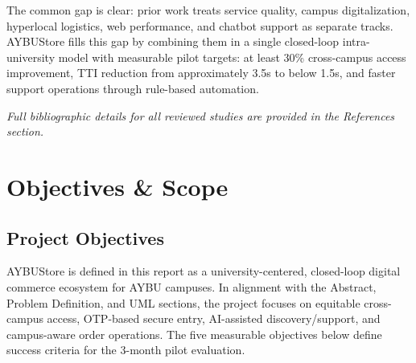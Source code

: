 \documentclass[11pt,a4paper]{article}
\begin{document}
The common gap is clear: prior work treats service quality, campus digitalization, hyperlocal logistics, web performance, and chatbot support as separate tracks. AYBUStore fills this gap by combining them in a single closed-loop intra-university model with measurable pilot targets: at least 30\% cross-campus access improvement, TTI reduction from approximately 3.5s to below 1.5s, and faster support operations through rule-based automation.

\textit{Full bibliographic details for all reviewed studies are provided in the References section.}

\newpage
\section{Objectives \& Scope}
\label{sec:objectives-scope}

\subsection{Project Objectives}
AYBUStore is defined in this report as a university-centered,
closed-loop digital commerce ecosystem for AYBU campuses. In alignment
with the Abstract, Problem Definition, and UML sections, the project
focuses on equitable cross-campus access, OTP-based secure entry,
AI-assisted discovery/support, and campus-aware order operations.
The five measurable objectives below define success criteria for the
3-month pilot evaluation.
\end{document}
